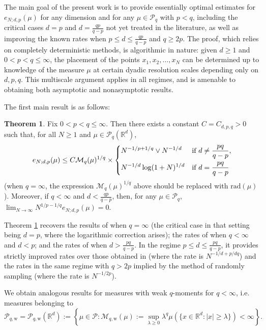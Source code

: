 \documentclass[11pt,reqno]{amsart}
\newcommand{\rad}{\mathrm{rad}}
\theoremstyle{definition}
\newcommand{\weak}{{\mathrm{w}}}
\newcommand{\Rd}{{\mathbb{R}^d}}
\newcommand{\RR}{{\mathbb R}}
\newcommand{\mcl}{\mathcal}
\newtheorem{theorem}{Theorem}
\theoremstyle{definition}
\numberwithin{equation}{section}
\numberwithin{lemma}{section}
\numberwithin{proposition}{section}
\numberwithin{theorem}{section}
\numberwithin{corollary}{section}
\numberwithin{definition}{section}
\numberwithin{remark}{section}
\begin{document}
The main goal of the present work is to provide essentially optimal estimates for $e_{N;d,p}(\mu)$ for any dimension and for any $\mu \in \mcl P_q$ with $p < q$, including the critical cases $d = p$ and $d = \frac{qp}{q-p}$ not yet treated in the literature, as well as improving the known rates when  $p \le d \le \frac{qp}{q-p}$ and $q \ge 2p$. The proof, which relies on completely deterministic methods, is algorithmic in nature: given $d \ge 1$ and $0 < p < q \le \infty$, the placement of the points $x_1,x_2,\ldots, x_N$ can be determined up to knowledge of the measure $\mu$ at certain dyadic resolution scales depending only on $d,p,q$. This multiscale argument applies in all regimes, and is amenable to obtaining both asymptotic and nonasymptotic results.

The first main result is as follows:

\begin{theorem}\label{thm:optimal_quantize}
	Fix $0 < p < q \le \infty$. Then there exists a constant $C = C_{d,p,q} > 0$ such that, for all $N \ge 1$ and $\mu \in \mcl P_q(\RR^d)$,
	\[
		e_{N;d,p}(\mu)
		\le C \mcl M_q(\mu)^{1/q} \times
		\begin{dcases}
			N^{-1/p + 1/q} \vee N^{-1/d} & \text{if } d \ne \frac{pq}{q-p},\\
			N^{-1/d} \log(1+N)^{1/d} & \text{if } d = \frac{pq}{q-p}
		\end{dcases}
	\]
    (when $q = \infty$, the expression $\mcl M_q(\mu)^{1/q}$ above should be replaced with $\rad(\mu)$). Moreover, if $q < \infty$ and $d < \frac{qp}{q-p}$, then, for any $\mu \in \mcl P_q$, $\lim_{N \to \infty} N^{1/p - 1/q} e_{N;d,p}(\mu) = 0$.
\end{theorem}


Theorem \ref{thm:optimal_quantize} recovers the results of \cite[Theorem 3]{Chev} when $q = \infty$ (the critical case in that setting being $d = p$, where the logarithmic correction arises); the rates of \cite[Corollary 1]{Chev} when $q < \infty$ and $d < p$; and the rates of \cite{Q} when $d > \frac{pq}{q-p}$. In the regime $p \le d \le \frac{pq}{q-p}$, it provides strictly improved rates over those obtained in \cite[Corollary 1]{Chev}  (where the rate is $N^{-1/d + p/dq}$) and the rates in the same regime with $q > 2p$ implied by the method of randomly sampling \cite[Theorem 1]{FG} (where the rate is $N^{-1/2p}$). 

We obtain analogous results for measures with weak $q$-moments for $q < \infty$, i.e. measures belonging to
\[
	\mcl P_{q,\weak} = \mcl P_{q,\weak}(\Rd) := \left\{ \mu \in \mcl P : \mcl M_{q,\weak}(\mu) := \sup_{ \lambda \ge 0} \lambda^q \mu( \{ x \in \Rd : |x| \ge \lambda \} ) < \infty \right\}.
\]
\end{document}
